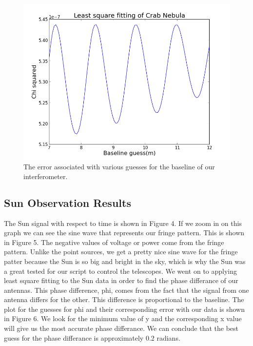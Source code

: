 \documentclass[12pt]{article}
\begin{document}
\begin {figure}[h!]
\centering
\includegraphics[scale = 0.5]
{chisquaredcrab.png}
\caption{\label{rvd} The error associated with various
  guesses for the baseline of our interferometer.}
\end {figure}

\subsection {Sun Observation Results}

The Sun signal with respect to time is shown in Figure 4. If we zoom in
on this graph we can see the sine wave that represents our fringe
pattern. This is shown in Figure 5. The negative values of voltage or
power come from the fringe pattern. Unlike the point sources, we get a
pretty nice sine wave for the fringe patter because the Sun is so big
and bright in the sky, which is why the Sun was a great tested for our
script to control the telescopes. We went on to applying least square
fitting to the Sun data in order to find the phase differance of our
antennas. This phase difference, phi, comes from the fact that the
signal from one antenna differs for the other. This difference is
proportional to the baseline. The plot for the guesses for phi and their
corresponding error with our data is shown in Figure 6. We look for the
minimum value of y and the corresponding x value will give us the most
accurate phase differance. We can conclude that the best guess for the
phase differance is approximately 0.2 radians.
\end{document}
